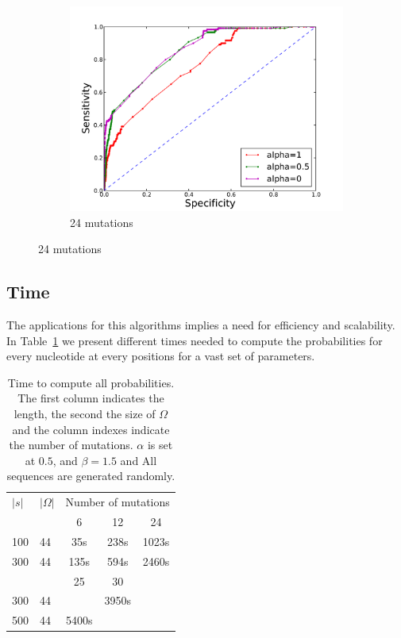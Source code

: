 \begin{figure}
\begin{subfigure}[b]{0.3\textwidth}
\includegraphics[width=1.2\textwidth]{figures/ROC_24.pdf}
\caption{24 mutations}
\end{subfigure}
\end{figure}




\subsection{Time}
The applications for this algorithms implies a need for efficiency
and scalability. In Table~\ref{tab:time} we
present different times needed to compute the probabilities for
 every nucleotide at every positions for a vast set of parameters.

\begin{table}
\begin{center}
\begin{tabular}{llccc}
$|s|$&$|\Omega|$&\multicolumn{3}{c}{Number of mutations}\\\cline{3-5}
		 & 				  & 6   &  12  & 24\\\cline{3-5}
100  & 44				& 35s  & 238s & 1023s\\
300  & 44				& 135s & 594s &2460s\\\cline{3-5}
		 &						& 25   & 30   &			\\\cline{3-5}
300  & 44       &      &  3950s&     \\
500  & 44       & 5400s&       &      \\
\end{tabular}
\end{center}
\caption{Time to compute all probabilities. The first column indicates the length, the second
 the size of $\Omega$ and  the column indexes indicate the number
 of mutations. $\alpha$ is
set at $0.5$, and $\beta=1.5$ and All sequences are generated randomly.}
\label{tab:time}
\end{table}
